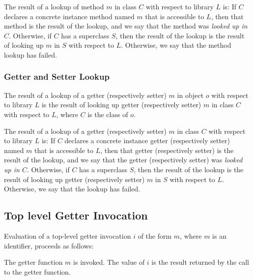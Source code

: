 \documentclass{article}
\begin{document}
\LMHash{}
The result of  a lookup of method $m$ in class $C$ with respect to library $L$ is:
If $C$ declares a concrete instance method named $m$ that is accessible to $L$,  then that method is the result of the lookup, and we say that the method was {\em looked up in $C$}. Otherwise, if $C$ has a superclass $S$, then the result of the lookup is the result of looking up $m$  in $S$ with respect to $L$. Otherwise, we say that the method lookup has failed.



\subsubsection{ Getter and Setter Lookup}

\LMHash{}
The result of a lookup of a getter (respectively setter) $m$ in object $o$  with respect  to  library $L$ is the result of looking up getter (respectively setter) $m$ in class $C$ with respect to $L$, where $C$ is the class of $o$.

\LMHash{}
The result of a lookup of a getter (respectively setter) $m$ in class $C$  with respect to library $L$ is:
If $C$ declares a concrete instance getter (respectively setter) named $m$  that is accessible to $L$,  then that getter (respectively setter) is the result of the lookup, and we say that the getter (respectively setter) was {\em looked up in $C$}. Otherwise, if $C$ has a superclass $S$, then the result of the lookup is the result of looking up getter (respectively setter) $m$ in $S$ with respect to $L$. Otherwise, we say that the lookup has failed.



\subsection{ Top level Getter Invocation}

\LMHash{}
Evaluation of a top-level getter invocation $i$ of the form $m$, where $m$ is an identifier, proceeds as follows:

\LMHash{}
The getter function $m$ is invoked. The value of $i$ is the result returned by the call to the getter function.
\end{document}

